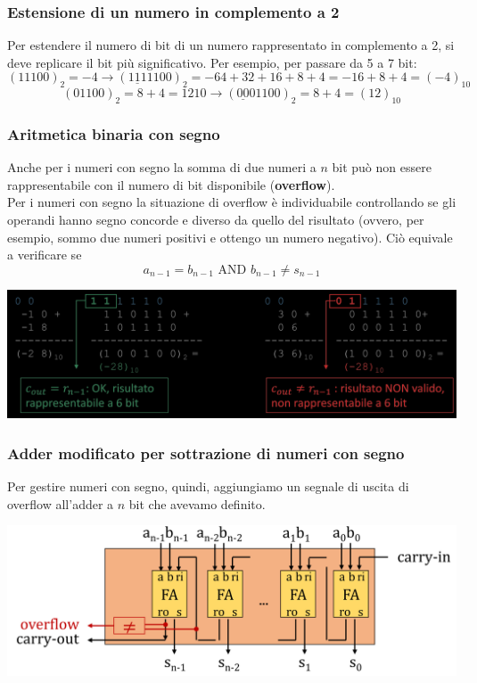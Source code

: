 \documentclass{article}
\begin{document}
\subsubsection*{Estensione di un numero in complemento a 2}
Per estendere il numero di bit di un numero rappresentato in complemento a 2, si deve replicare il bit più significativo. Per esempio, per passare da 5 a 7 bit:
$$ (11100)_2 = -4 \rightarrow (\underline{111}1100)_2 = -64 + 32 + 16 + 8 + 4= -16 + 8 + 4 = (-4)_{10} $$
$$ (01100)_2 = 8 + 4 = 12 10 \rightarrow (\underline{00}01100)_2 = 8 + 4 = (12)_{10} $$



\subsubsection{Aritmetica binaria con segno}
Anche per i numeri con segno la somma di due numeri a $n$ bit può non essere rappresentabile con il numero di bit disponibile (\textbf{\color{cyan}overflow}).\\
Per i numeri con segno la situazione di overflow è individuabile controllando se gli operandi hanno segno concorde e diverso da quello del risultato (ovvero, per esempio, sommo due numeri positivi e ottengo un numero negativo). Ciò equivale a verificare se
$$ a_{n-1} = b_{n-1}\text{ AND } b_{n-1} \neq s_{n-1} $$
\begin{center}
    \includegraphics[scale=0.35]{aritmetica con segno.png}
\end{center}



\subsubsection{Adder modificato per sottrazione di numeri con segno}
Per gestire numeri con segno, quindi, aggiungiamo un segnale di uscita di overflow all’adder a $n$ bit che avevamo definito.
\begin{center}
    \includegraphics[scale=0.35]{n bit adder modificato.png}
\end{center}
\end{document}
